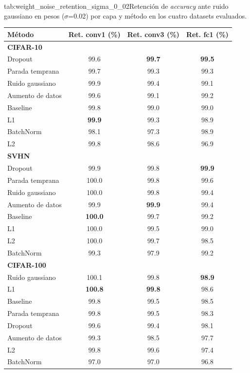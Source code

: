 \begin{table}{tab:weight_noise_retention_sigma_0_02}{Retención de \textit{accuracy} ante ruido gaussiano en pesos ($\sigma$=0.02) por capa y método en los cuatro datasets evaluados.}
\small
\begin{tabular}{lccc}
\toprule
\textbf{Método} & \textbf{Ret. conv1 (\%)} & \textbf{Ret. conv3 (\%)} & \textbf{Ret. fc1 (\%)} \\
\midrule
\multicolumn{4}{l}{\textbf{CIFAR-10}}\\
\midrule
Dropout & 99.6 & \textbf{99.7} & \textbf{99.5} \\
Parada temprana & 99.7 & 99.3 & 99.3 \\
Ruido gaussiano & 99.9 & 99.4 & 99.1 \\
Aumento de datos & 99.6 & 99.1 & 99.2 \\
Baseline & 99.8 & 99.0 & 99.0 \\
L1 & \textbf{99.9} & 99.3 & 98.9 \\
BatchNorm & 98.1 & 97.3 & 98.9 \\
L2 & 99.8 & 98.6 & 96.9 \\
\midrule
\multicolumn{4}{l}{\textbf{SVHN}}\\
\midrule
Dropout & 99.9 & 99.8 & \textbf{99.9} \\
Parada temprana & 100.0 & 99.8 & 99.6 \\
Ruido gaussiano & 100.0 & 99.8 & 99.4 \\
Aumento de datos & 99.9 & \textbf{99.9} & 99.4 \\
Baseline & \textbf{100.0} & 99.7 & 99.2 \\
L1 & 100.0 & 99.5 & 99.0 \\
L2 & 100.0 & 99.7 & 98.5 \\
BatchNorm & 99.3 & 97.9 & 99.2 \\
\midrule
\multicolumn{4}{l}{\textbf{CIFAR-100}}\\
\midrule
Ruido gaussiano & 100.1 & 99.8 & \textbf{98.9} \\
L1 & \textbf{100.8} & \textbf{99.8} & 98.6 \\
Baseline & 99.8 & 99.5 & 98.5 \\
Parada temprana & 99.8 & 99.5 & 98.3 \\
Dropout & 99.6 & 99.4 & 98.1 \\
Aumento de datos & 99.3 & 98.5 & 97.7 \\
L2 & 99.8 & 99.6 & 97.4 \\
BatchNorm & 97.0 & 97.0 & 96.8 \\

\end{tabular}
\end{table}
